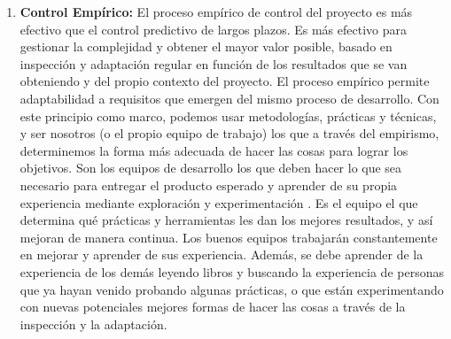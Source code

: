 \begin{enumerate}

\item \textbf{Control Empírico:} El proceso empírico de control del proyecto es más efectivo que el control predictivo de largos plazos. Es más efectivo para gestionar la complejidad y obtener el mayor valor posible, basado en inspección y adaptación regular en función de los resultados que se van obteniendo y del propio contexto del proyecto. El proceso empírico permite adaptabilidad a requisitos que emergen del mismo proceso de desarrollo. Con este principio como marco, podemos usar metodologías, prácticas y técnicas, y ser nosotros (o el propio equipo de trabajo) los que a través del empirismo, determinemos la forma más adecuada de hacer las cosas para lograr los objetivos. Son los equipos de desarrollo los que deben hacer lo que sea necesario para entregar el producto esperado y aprender de su propia experiencia mediante exploración y experimentación \cite{UNTREF-2014}. Es el equipo el que determina qué prácticas y herramientas les dan los mejores resultados, y así mejoran de manera continua. Los buenos equipos trabajarán constantemente en mejorar y aprender de sus experiencia. Además, se debe aprender de la experiencia de los demás leyendo libros y buscando la experiencia de personas que ya hayan venido probando algunas prácticas, o que están experimentando con nuevas potenciales mejores formas de hacer las cosas a través de la inspección y la adaptación. 


\end{enumerate}
